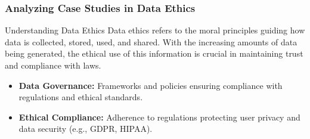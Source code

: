 \documentclass[aspectratio=169]{beamer}
\begin{document}
\begin{frame}[fragile]
    \frametitle{Analyzing Case Studies in Data Ethics}
    \begin{block}{Understanding Data Ethics}
        Data ethics refers to the moral principles guiding how data is collected, stored, used, and shared. With the increasing amounts of data being generated, the ethical use of this information is crucial in maintaining trust and compliance with laws.
    \end{block}
    
    \begin{itemize}
        \item \textbf{Data Governance:} Frameworks and policies ensuring compliance with regulations and ethical standards.
        \item \textbf{Ethical Compliance:} Adherence to regulations protecting user privacy and data security (e.g., GDPR, HIPAA).
    \end{itemize}
\end{frame}
\end{document}
